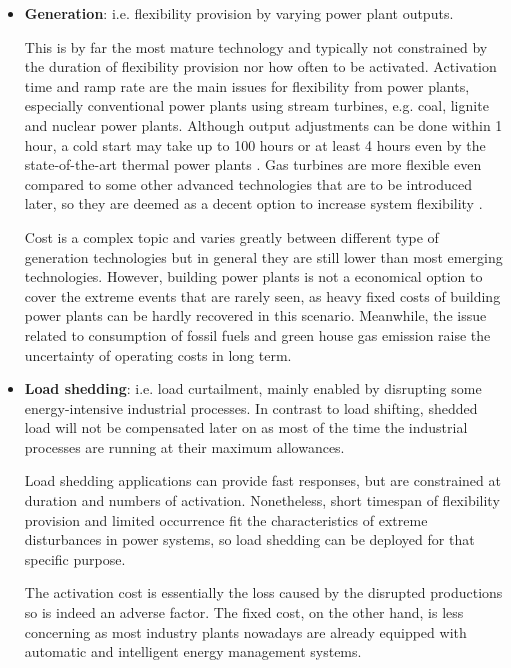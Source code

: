 \begin{itemize}
	\item \textbf{Generation}: i.e. flexibility provision by varying power plant outputs. 
	
	This is by far the most mature technology and typically not constrained by the duration of flexibility provision nor how often to be activated. Activation time and ramp rate are the main issues for flexibility from power plants, especially conventional power plants using stream turbines, e.g. coal, lignite and nuclear power plants. Although output adjustments can be done within 1 hour, a cold start may take up to 100 hours or at least 4 hours even by the state-of-the-art thermal power plants \cite{Muller2016,AgoraEnergiewende2017}. Gas turbines are more flexible even compared to some other advanced technologies that are to be introduced later, so they are deemed as a decent option to increase system flexibility \cite{Muller2016}.
	
	Cost is a complex topic and varies greatly between different type of generation technologies but in general they are still lower than most emerging technologies. However, building power plants is not a economical option to cover the extreme events that are rarely seen, as heavy fixed costs of building power plants can be hardly recovered in this scenario. Meanwhile, the issue related to consumption of fossil fuels and green house gas emission raise the uncertainty of operating costs in long term.
	
	\item \textbf{Load shedding}: i.e. load curtailment, mainly enabled by disrupting some energy-intensive industrial processes. In contrast to load shifting, shedded load will not be compensated later on as most of the time the industrial processes are running at their maximum allowances.
	
	Load shedding applications can provide fast responses, but are constrained at duration and numbers of activation. Nonetheless, short timespan of flexibility provision and limited occurrence fit the characteristics of extreme disturbances in power systems, so load shedding can be deployed for that specific purpose.
	
	The activation cost is essentially the loss caused by the disrupted productions so is indeed an adverse factor. The fixed cost, on the other hand, is less concerning as most industry plants nowadays are already equipped with automatic and intelligent energy management systems.
	

\end{itemize}
